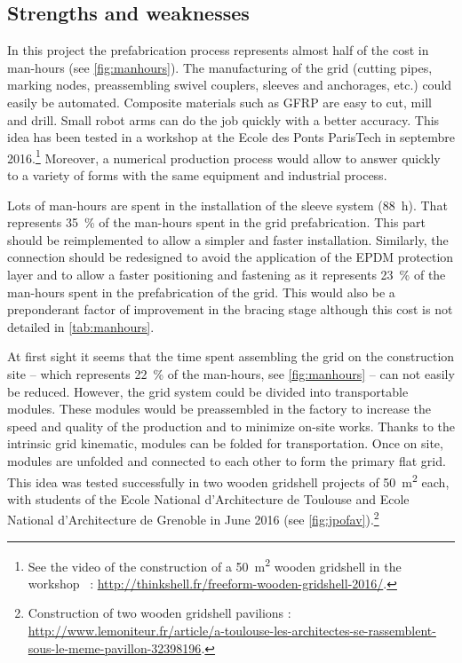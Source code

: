 \subsection{Strengths and weaknesses}
In this project the prefabrication process represents almost half of the cost in man-hours (see \cref{fig:manhours}). The manufacturing of the grid (cutting pipes, marking nodes, preassembling swivel couplers, sleeves and anchorages, etc.) could easily be automated. Composite materials such as GFRP are easy to cut, mill and drill. Small robot arms can do the job quickly with a better accuracy. This idea has been tested in a workshop at the Ecole des Ponts ParisTech in septembre 2016.\footnote{See the video of the construction of a 50~m\textsuperscript{2} wooden gridshell in the workshop ~: \url{http://thinkshell.fr/freeform-wooden-gridshell-2016/}.} Moreover, a numerical production process would allow to answer quickly to a variety of forms with the same equipment and industrial process.

Lots of man-hours are spent in the installation of the sleeve system (88~h). That represents 35~\% of the man-hours spent in the grid prefabrication. This part should be reimplemented to allow a simpler and faster installation. Similarly, the connection should be redesigned to avoid the application of the EPDM protection layer and to allow a faster positioning and fastening as it represents 23~\% of the man-hours spent in the prefabrication of the grid. This would also be a preponderant factor of improvement in the bracing stage although this cost is not detailed in \cref{tab:manhours}.

At first sight it seems that the time spent assembling the grid on the construction site -- which represents 22~\% of the man-hours, see \cref{fig:manhours} -- can not easily be reduced. However, the grid system could be divided into transportable modules. These modules would be preassembled in the factory to increase the speed and quality of the production and to minimize on-site works. Thanks to the intrinsic grid kinematic, modules can be folded for transportation. Once on site, modules are unfolded and connected to each other to form the primary flat grid. This idea was tested successfully in two wooden gridshell projects of 50~m\textsuperscript{2} each, with students of the Ecole National d'Architecture de Toulouse and Ecole National d'Architecture de Grenoble in June 2016 (see \cref{fig:jpofav}).\footnote{Construction of two wooden gridshell pavilions : \url{http://www.lemoniteur.fr/article/a-toulouse-les-architectes-se-rassemblent-sous-le-meme-pavillon-32398196}.}

